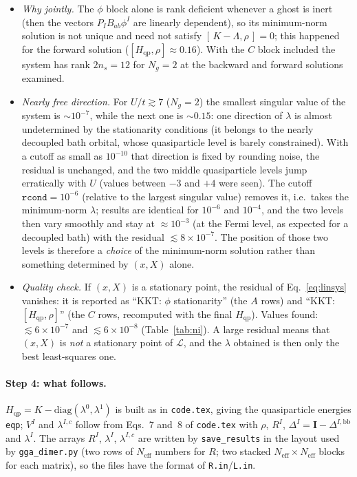 \documentclass[11pt]{article}
\newcommand{\Neff}{N_{\mathrm{eff}}}
\newcommand{\Ng}{N_{g}}
\newcommand{\Hqp}{H_{\mathrm{qp}}}
\newcommand{\Ybb}{\Delta^{I,\mathrm{bb}}}
\begin{document}
\begin{itemize}
  \item \emph{Why jointly.} The $\phi$ block alone is rank deficient whenever a ghost is inert
    (then the vectors $P_I B_{ab}\phi^I$ are linearly dependent), so its minimum-norm solution
    is not unique and need not satisfy $[\,K-\Lambda,\rho\,]=0$; this happened for the forward
    solution ($[\Hqp,\rho]\approx0.16$). With the $C$ block included the system has rank
    $2n_s=12$ for $\Ng=2$ at the backward and forward solutions examined.
  \item \emph{Nearly free direction.} For $U/t\gtrsim7$ ($\Ng=2$) the smallest singular value of
    the system is $\sim10^{-7}$, while the next one is $\sim0.15$: one direction of $\lambda$
    is almost undetermined by the stationarity conditions (it belongs to the nearly decoupled
    bath orbital, whose quasiparticle level is barely constrained). With a cutoff as small as
    $10^{-10}$ that direction is fixed by rounding noise, the residual is unchanged, and the two
    middle quasiparticle levels jump erratically with $U$ (values between $-3$ and $+4$ were
    seen). The cutoff $\texttt{rcond}=10^{-6}$ (relative to the largest singular value) removes
    it, i.e.\ takes the minimum-norm $\lambda$; results are identical for $10^{-6}$ and
    $10^{-4}$, and the two levels then vary smoothly and stay at $\approx10^{-3}$ (at the Fermi
    level, as expected for a decoupled bath) with the residual $\lesssim8\times10^{-7}$. The
    position of those two levels is therefore a \emph{choice} of the minimum-norm solution
    rather than something determined by $(x,X)$ alone.
  \item \emph{Quality check.} If $(x,X)$ is a stationary point, the residual of
    Eq.~\eqref{eq:linsys} vanishes: it is reported as ``KKT: $\phi$ stationarity''
    (the $A$ rows) and ``KKT: $[\Hqp,\rho]$'' (the $C$ rows, recomputed with the final
    $\Hqp$). Values found: $\lesssim6\times10^{-7}$ and $\lesssim6\times10^{-8}$
    (Table~\ref{tab:ni}). A large residual means that $(x,X)$ is \emph{not} a stationary
    point of $\mathcal L$, and the $\lambda$ obtained is then only the best least-squares one.
\end{itemize}

\paragraph{Step 4: what follows.}
$\Hqp=K-\mathrm{diag}(\lambda^0,\lambda^1)$ is built as in \texttt{code.tex}, giving the
quasiparticle energies \texttt{eqp}; $V^I$ and $\lambda^{I,c}$ follow from Eqs.~7 and~8 of
\texttt{code.tex} with $\rho$, $R^I$, $\Delta^I=\mathbf I-\Ybb$ and $\lambda^I$. The arrays
$R^I$, $\lambda^I$, $\lambda^{I,c}$ are written by \texttt{save\_results} in the layout used by
\texttt{gga\_dimer.py} (two rows of $\Neff$ numbers for $R$; two stacked $\Neff\times\Neff$
blocks for each matrix), so the files have the format of \texttt{R.in}/\texttt{L.in}.
\end{document}
